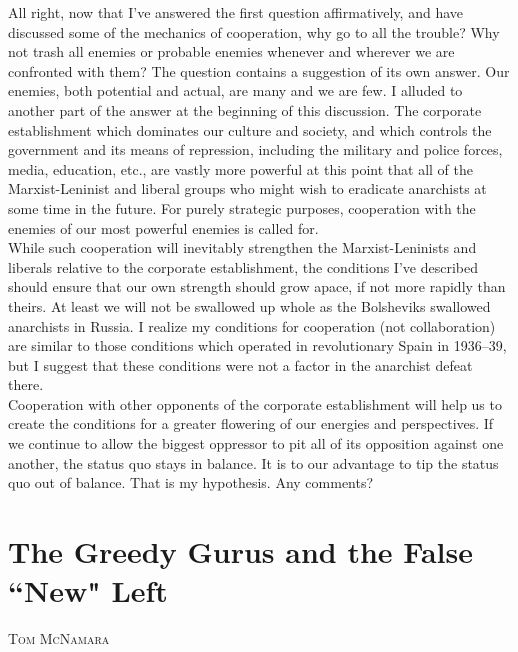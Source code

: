 \documentclass[12pt, onecolumn, letterpaper, oneside]{book}
\makeatletter
\newcommand\chapterauthor[1]{\authortoc{#1}\printchapterauthor{#1}}
\newcommand{\printchapterauthor}[1]{%
  {\parindent0pt\vspace*{-25pt}%
  \linespread{1.1}\large\scshape#1%
  \par\nobreak\vspace*{35pt}}
  \@afterheading%
}
\newcommand{\authortoc}[1]{%
  \addtocontents{toc}{\vskip-10pt}%
  \addtocontents{toc}{%
    \protect\contentsline{chapter}%
    {\hskip1.3em\mdseries\scshape\protect\scriptsize#1}{}{}}
  \addtocontents{toc}{\vskip5pt}%
}
\makeatother
\begin{document}
All right, now that I've answered the first question affirmatively, and have discussed some of the mechanics of cooperation, why go to all the trouble? Why not trash all enemies or probable enemies whenever and wherever we are confronted with them? The question contains a suggestion of its own answer. Our enemies, both potential and actual, are many and we are few. I alluded to another part of the answer at the beginning of this discussion. The corporate establishment which dominates our culture and society, and which controls the government and its means of repression, including the military and police forces, media, education, etc., are vastly more powerful at this point that all of the Marxist-Leninist and liberal groups who might wish to eradicate anarchists at some time in the future. For purely strategic purposes, cooperation with the enemies of our most powerful enemies is called for.\\
While such cooperation will inevitably strengthen the Marxist-Leninists and liberals relative to the corporate establishment, the conditions I've described should ensure that our own strength should grow apace, if not more rapidly than theirs. At least we will not be swallowed up whole as the Bolsheviks swallowed anarchists in Russia. I realize my conditions for cooperation (not collaboration) are similar to those conditions which operated in revolutionary Spain in 1936--39, but I suggest that these conditions were not a factor in the anarchist defeat there.\\
Cooperation with other opponents of the corporate establishment will help us to create the conditions for a greater flowering of our energies and perspectives. If we continue to allow the biggest oppressor to pit all of its opposition against one another, the status quo stays in balance. It is to our advantage to tip the status quo out of balance. That is my hypothesis. Any comments?


\chapter{The Greedy Gurus and the False ``New" Left}
\chapterauthor{Tom McNamara}
\end{document}

